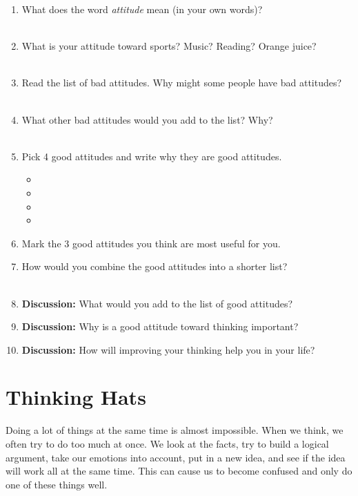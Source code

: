 \begin{enumerate}
	\item What does the word \textit{attitude} mean (in your own words)? \\\\
	\item What is your attitude toward sports? Music? Reading? Orange juice? \\\\
	\item Read the list of bad attitudes. Why might some people have bad attitudes? \\\\
	\item What other bad attitudes would you add to the list? Why? \\\\
	\item Pick 4 good attitudes and write why they are good attitudes.
		\begin{itemize}
			\item 
			\item
			\item 
			\item 
		\end{itemize}
	\item Mark the 3 good attitudes you think are most useful for you.
	\item How would you combine the good attitudes into a shorter list? \\\\
	\item \textbf{Discussion:} What would you add to the list of good attitudes?
	\item \textbf{Discussion:} Why is a good attitude toward thinking important?
	\item \textbf{Discussion:} How will improving your thinking help you in your life?
\end{enumerate}



\chapter{Thinking Hats}


Doing a lot of things at the same time is almost impossible. When we think, we often try to do too much at once. We look at the facts, try to build a logical argument, take our emotions into account, put in a new idea, and see if the idea will work all at the same time. This can cause us to become confused and only do one of these things well.

